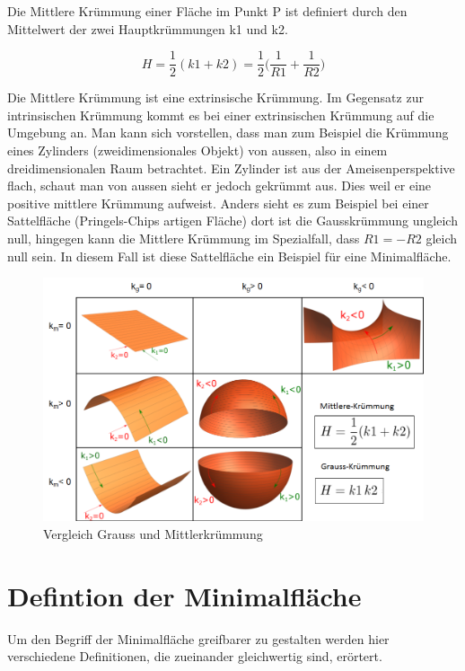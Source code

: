 \begin{refsection}

Die Mittlere Krümmung einer Fläche im Punkt P ist definiert durch den Mittelwert der zwei Hauptkrümmungen k1 und k2.

\begin{equation} \label{Mittlere Kruemmung_D}
  H=\frac{1}{2}(k1+k2)= \frac{1}{2}\bigg(\frac{1}{R1}+\frac{1}{R2}\bigg)
\end{equation}

Die Mittlere Krümmung ist eine extrinsische Krümmung. 
Im Gegensatz zur intrinsischen Krümmung kommt es bei einer extrinsischen Krümmung auf die Umgebung an. 
Man kann sich vorstellen, dass man zum Beispiel die Krümmung eines Zylinders (zweidimensionales Objekt) von aussen, also in einem dreidimensionalen Raum betrachtet. 
Ein Zylinder ist aus der Ameisenperspektive flach, schaut man von aussen sieht er jedoch gekrümmt aus.
Dies weil er eine positive mittlere Krümmung aufweist. 
Anders sieht es zum Beispiel bei einer Sattelfläche (Pringels-Chips artigen Fläche) dort ist die Gausskrümmung ungleich null, hingegen kann die Mittlere Krümmung im Spezialfall, dass $R1=-R2$ gleich null sein. In diesem Fall ist diese Sattelfläche ein Beispiel für eine Minimalfläche.

\begin{figure} [H]
  \centering
  \includegraphics[scale=0.4]{minimal/Tabelle_Kruemmung.png}
  \caption{Vergleich Grauss und Mittlerkrümmung} 
\end{figure}




\section{Defintion der Minimalfläche}
Um den Begriff der Minimalfläche greifbarer zu gestalten werden hier verschiedene Definitionen, die zueinander gleichwertig sind, erörtert.


\end{refsection}

